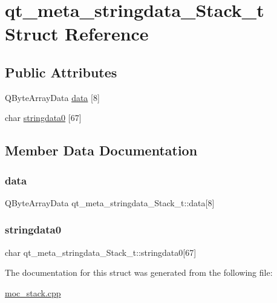 \hypertarget{structqt__meta__stringdata__Stack__t}{}\section{qt\+\_\+meta\+\_\+stringdata\+\_\+\+Stack\+\_\+t Struct Reference}
\label{structqt__meta__stringdata__Stack__t}
\subsection*{Public Attributes}
\begin{DoxyCompactItemize}
\item 
Q\+Byte\+Array\+Data \mbox{\hyperlink{structqt__meta__stringdata__Stack__t_aff664562e498e7f58fc26c683526ae14}{data}} \mbox{[}8\mbox{]}
\item 
char \mbox{\hyperlink{structqt__meta__stringdata__Stack__t_ae7fb9b29c1f800b1c2960048453e7d56}{stringdata0}} \mbox{[}67\mbox{]}
\end{DoxyCompactItemize}


\subsection{Member Data Documentation}
\mbox{\label{structqt__meta__stringdata__Stack__t_aff664562e498e7f58fc26c683526ae14}} 
\subsubsection{\texorpdfstring{data}{data}}
{\footnotesize\ttfamily Q\+Byte\+Array\+Data qt\+\_\+meta\+\_\+stringdata\+\_\+\+Stack\+\_\+t\+::data\mbox{[}8\mbox{]}}

\mbox{\label{structqt__meta__stringdata__Stack__t_ae7fb9b29c1f800b1c2960048453e7d56}} 
\subsubsection{\texorpdfstring{stringdata0}{stringdata0}}
{\footnotesize\ttfamily char qt\+\_\+meta\+\_\+stringdata\+\_\+\+Stack\+\_\+t\+::stringdata0\mbox{[}67\mbox{]}}



The documentation for this struct was generated from the following file\+:\begin{DoxyCompactItemize}
\item 
\mbox{\hyperlink{moc__stack_8cpp}{moc\+\_\+stack.\+cpp}}\end{DoxyCompactItemize}
